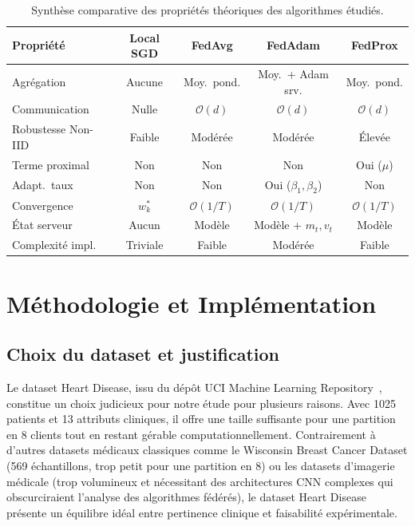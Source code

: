 \documentclass[12pt,a4paper]{report}
\begin{document}
\begin{table}[H]
\centering
\caption{Synth\`{e}se comparative des propri\'{e}t\'{e}s th\'{e}oriques des algorithmes \'{e}tudi\'{e}s.}
\label{tab:synth_theo}
\begin{tabular}{lcccc}
\toprule
\textbf{Propri\'{e}t\'{e}} & \textbf{Local SGD} & \textbf{FedAvg} & \textbf{FedAdam} & \textbf{FedProx} \\
\midrule
Agr\'{e}gation        & Aucune       & Moy.\ pond.   & Moy.\ + Adam srv.  & Moy.\ pond. \\
Communication     & Nulle        & $\mathcal{O}(d)$  & $\mathcal{O}(d)$  & $\mathcal{O}(d)$ \\
Robustesse Non-IID & Faible     & Mod\'{e}r\'{e}e      & Mod\'{e}r\'{e}e           & \'{E}lev\'{e}e \\
Terme proximal    & Non          & Non           & Non               & Oui ($\mu$) \\
Adapt.\ taux      & Non          & Non           & Oui ($\beta_1, \beta_2$) & Non \\
Convergence       & $w_k^*$      & $\mathcal{O}(1/T)$  & $\mathcal{O}(1/T)$  & $\mathcal{O}(1/T)$ \\
\'{E}tat serveur      & Aucun        & Mod\`{e}le         & Mod\`{e}le + $m_t, v_t$ & Mod\`{e}le \\
Complexit\'{e} impl.  & Triviale     & Faible        & Mod\'{e}r\'{e}e           & Faible \\
\bottomrule
\end{tabular}
\end{table}

\chapter{M\'{e}thodologie et Impl\'{e}mentation}

\section{Choix du dataset et justification}

Le dataset Heart Disease, issu du d\'{e}p\^{o}t UCI Machine Learning Repository~\cite{uci_heart}, constitue un choix judicieux pour notre \'{e}tude pour plusieurs raisons. Avec 1025 patients et 13 attributs cliniques, il offre une taille suffisante pour une partition en 8 clients tout en restant g\'{e}rable computationnellement. Contrairement \`{a} d'autres datasets m\'{e}dicaux classiques comme le Wisconsin Breast Cancer Dataset (569 \'{e}chantillons, trop petit pour une partition en 8) ou les datasets d'imagerie m\'{e}dicale (trop volumineux et n\'{e}cessitant des architectures CNN complexes qui obscurciraient l'analyse des algorithmes f\'{e}d\'{e}r\'{e}s), le dataset Heart Disease pr\'{e}sente un \'{e}quilibre id\'{e}al entre pertinence clinique et faisabilit\'{e} exp\'{e}rimentale.
\end{document}
